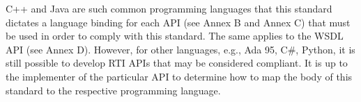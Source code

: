 
\clearpage

\begin{compactstdpage}

    C++ and Java are such common programming languages that this standard dictates a language binding for each API (see Annex B and Annex C) that must be used in order to comply with this standard. The same applies to the WSDL API (see Annex D). However, for other languages, e.g., Ada 95, C\#, Python, it is still possible to develop RTI APIs that may be considered compliant. It is up to the implementer of the particular API to determine how to map the body of this standard to the respective programming language.
\end{compactstdpage}

\clearpage

\thispagestyle{body}
\null
